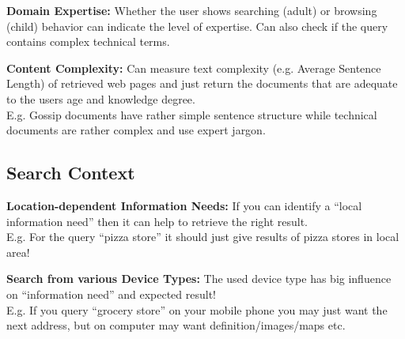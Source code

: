 \documentclass[a4paper,11pt]{article}
\begin{document}
\begin{multicols}{2}
\textbf{Domain Expertise:} Whether the user shows searching (adult) or browsing (child) behavior can indicate the level of expertise. Can also check if the query contains complex technical terms. 

\textbf{Content Complexity:} Can measure text complexity (e.g. Average Sentence Length) of retrieved web pages and just return the documents that are adequate to the users age and knowledge degree.\\
E.g. Gossip documents have rather simple sentence structure while technical documents are rather complex and use expert jargon.

\subsection{Search Context}
\textbf{Location-dependent Information Needs:} If you can identify a ``local information need'' then it can help to retrieve the right result. \\
E.g. For the query ``pizza store'' it should just give results of pizza stores in local area!

\textbf{Search from various Device Types:} The used device type has big influence on ``information need'' and expected result!\\
E.g. If you query ``grocery store'' on your mobile phone you may just want the next address, but on computer may want definition/images/maps etc.

\end{multicols}%
\end{document}
